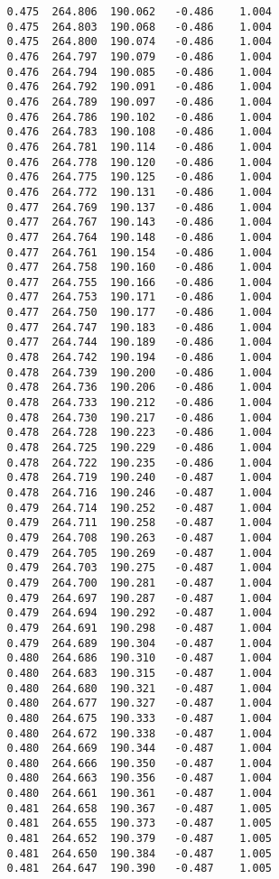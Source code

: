 \begin{verbatim}
   0.475  264.806  190.062   -0.486    1.004
   0.475  264.803  190.068   -0.486    1.004
   0.475  264.800  190.074   -0.486    1.004
   0.476  264.797  190.079   -0.486    1.004
   0.476  264.794  190.085   -0.486    1.004
   0.476  264.792  190.091   -0.486    1.004
   0.476  264.789  190.097   -0.486    1.004
   0.476  264.786  190.102   -0.486    1.004
   0.476  264.783  190.108   -0.486    1.004
   0.476  264.781  190.114   -0.486    1.004
   0.476  264.778  190.120   -0.486    1.004
   0.476  264.775  190.125   -0.486    1.004
   0.476  264.772  190.131   -0.486    1.004
   0.477  264.769  190.137   -0.486    1.004
   0.477  264.767  190.143   -0.486    1.004
   0.477  264.764  190.148   -0.486    1.004
   0.477  264.761  190.154   -0.486    1.004
   0.477  264.758  190.160   -0.486    1.004
   0.477  264.755  190.166   -0.486    1.004
   0.477  264.753  190.171   -0.486    1.004
   0.477  264.750  190.177   -0.486    1.004
   0.477  264.747  190.183   -0.486    1.004
   0.477  264.744  190.189   -0.486    1.004
   0.478  264.742  190.194   -0.486    1.004
   0.478  264.739  190.200   -0.486    1.004
   0.478  264.736  190.206   -0.486    1.004
   0.478  264.733  190.212   -0.486    1.004
   0.478  264.730  190.217   -0.486    1.004
   0.478  264.728  190.223   -0.486    1.004
   0.478  264.725  190.229   -0.486    1.004
   0.478  264.722  190.235   -0.486    1.004
   0.478  264.719  190.240   -0.487    1.004
   0.478  264.716  190.246   -0.487    1.004
   0.479  264.714  190.252   -0.487    1.004
   0.479  264.711  190.258   -0.487    1.004
   0.479  264.708  190.263   -0.487    1.004
   0.479  264.705  190.269   -0.487    1.004
   0.479  264.703  190.275   -0.487    1.004
   0.479  264.700  190.281   -0.487    1.004
   0.479  264.697  190.287   -0.487    1.004
   0.479  264.694  190.292   -0.487    1.004
   0.479  264.691  190.298   -0.487    1.004
   0.479  264.689  190.304   -0.487    1.004
   0.480  264.686  190.310   -0.487    1.004
   0.480  264.683  190.315   -0.487    1.004
   0.480  264.680  190.321   -0.487    1.004
   0.480  264.677  190.327   -0.487    1.004
   0.480  264.675  190.333   -0.487    1.004
   0.480  264.672  190.338   -0.487    1.004
   0.480  264.669  190.344   -0.487    1.004
   0.480  264.666  190.350   -0.487    1.004
   0.480  264.663  190.356   -0.487    1.004
   0.480  264.661  190.361   -0.487    1.004
   0.481  264.658  190.367   -0.487    1.005
   0.481  264.655  190.373   -0.487    1.005
   0.481  264.652  190.379   -0.487    1.005
   0.481  264.650  190.384   -0.487    1.005
   0.481  264.647  190.390   -0.487    1.005

\end{verbatim}
